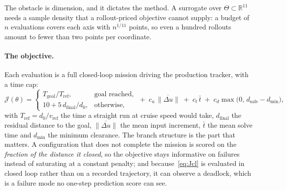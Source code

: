 \documentclass[11pt,a4paper]{article}
\newcommand{\R}{\mathbb{R}}
\newcommand{\dsafe}{d_{\mathrm{safe}}}
\begin{document}
The obstacle is dimension, and it dictates the method. A surrogate over $\Theta\subset\R^{11}$ needs a sample
density that a rollout-priced objective cannot supply: a budget of $n$ evaluations covers each axis with
$n^{1/11}$ points, so even a hundred rollouts amount to fewer than two points per coordinate.

\paragraph{The objective.} Each evaluation is a full closed-loop mission driving the production tracker, with
a time cap:
\begin{equation}
  \mathcal{J}(\theta)=
  \begin{cases}
    T_{\mathrm{goal}}/T_{\mathrm{ref}}, & \text{goal reached},\\[2pt]
    10+5\,d_{\mathrm{final}}/d_0, & \text{otherwise},
  \end{cases}
  \;+\;c_u\,\overline{\|\Delta u\|}\;+\;c_t\,\bar t\;+\;c_d\max\big(0,\,\dsafe-d_{\min}\big),
  \label{eq:Jcl}
\end{equation}
with $T_{\mathrm{ref}}=d_0/v_{\mathrm{ref}}$ the time a straight run at cruise speed would take,
$d_{\mathrm{final}}$ the residual distance to the goal, $\overline{\|\Delta u\|}$ the mean input increment,
$\bar t$ the mean solve time and $d_{\min}$ the minimum clearance. The branch structure is the part that
matters. A configuration that does not complete the mission is scored on the \emph{fraction of the distance
it closed}, so the objective stays informative on failures instead of saturating at a constant penalty; and
because~\eqref{eq:Jcl} is evaluated in closed loop rather than on a recorded trajectory, it can observe a
deadlock, which is a failure mode no one-step prediction score can see.
\end{document}
